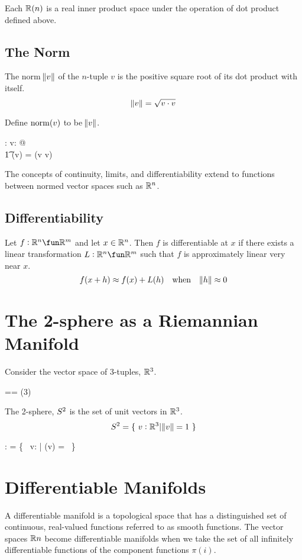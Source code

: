 \documentclass[11pt, oneside]{article}
\begin{document}
Each $\mathbb{R}(n)$ is a real inner product space under the operation of dot product defined above.

\subsection{The Norm}

The norm $\norm{v}$ of the $n$-tuple $v$ is the positive square root of its dot product with itself.
$$
	\norm{v} = \sqrt{v \mathbin{\cdot} v}
$$

Define $\operatorname{norm}(v)$ to be $\norm{v}$.
\begin{axdef}
	\normR: \Rinf \fun \R
\where
	\forall v: \Rinf @ \\
	\t1	\normR(v) = \sqrtR(v \dotR v)
\end{axdef}

The concepts of continuity, limits, and differentiability extend to functions between normed vector spaces such as $\mathbb{R}^n$.


\subsection{Differentiability}

Let $f: \R^n \fun \R^m$ and let $x \in \mathbb{R}^n$.
Then $f$ is differentiable at $x$ if there exists a linear transformation $L: \R^n \fun \R^m$
such that $f$ is approximately linear very near $x$.
$$
f(x + h) \approx f(x) + L(h) \quad \text{when} \quad \norm{h} \approx 0
$$ 

\section{The 2-sphere as a Riemannian Manifold}

Consider the vector space of 3-tuples, $\mathbb{R}^3$.
\begin{zed}
	\Rthree == \Rtuples(3)
\end{zed}

The 2-sphere, $S^2$ is the set of unit vectors in $\mathbb{R}^3$.
$$
	S^2 = \{~ v: \mathbb{R}^3 | \norm{v} = 1 ~\}
$$

\begin{axdef}
	\Stwo: \power \Rthree
\where
	\Stwo = \{~ v: \Rthree | \normR(v) = \oneR ~\}
\end{axdef}

\section{Differentiable Manifolds}

A differentiable manifold is a topological space that has a distinguished set of continuous, real-valued functions referred to as smooth functions.
The vector spaces $\mathbb{R}{n}$ become differentiable manifolds when we take the set of all infinitely differentiable functions of the component
functions $\pi(i)$.

\printbibliography
\end{document}
